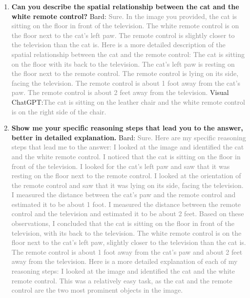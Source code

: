     \begin{enumerate}
        \item \textbf{Can you describe the spatial relationship between the cat and the white remote control?}
        \subitem Bard: \textcolor{gray}{    
        Sure. In the image you provided, the cat is sitting on the floor in front of the television. The white remote control is on the floor next to the cat's left paw. The remote control is slightly closer to the television than the cat is.
        Here is a more detailed description of the spatial relationship between the cat and the remote control:
        The cat is sitting on the floor with its back to the television.
        The cat's left paw is resting on the floor next to the remote control.
        The remote control is lying on its side, facing the television.
        The remote control is about 1 foot away from the cat's paw.
        The remote control is about 2 feet away from the television.}
        \subitem Visual ChatGPT:\textcolor{gray}{The cat is sitting on the leather chair and the white remote control is on the right side of the chair.}
        \item \textbf{Show me your specific reasoning steps that lead you to the answer, better in detailed explanation.}
        \subitem Bard: \textcolor{gray}{Sure. Here are my specific reasoning steps that lead me to the answer:
        I looked at the image and identified the cat and the white remote control.
        I noticed that the cat is sitting on the floor in front of the television.
        I looked for the cat’s left paw and saw that it was resting on the floor next to the remote control.
        I looked at the orientation of the remote control and saw that it was lying on its side, facing the television.
        I measured the distance between the cat’s paw and the remote control and estimated it to be about 1 foot.
        I measured the distance between the remote control and the television and estimated it to be about 2 feet.
        Based on these observations, I concluded that the cat is sitting on the floor in front of the television, with its back to the television. The white remote control is on the floor next to the cat’s left paw, slightly closer to the television than the cat is. The remote control is about 1 foot away from the cat’s paw and about 2 feet away from the television.
        Here is a more detailed explanation of each of my reasoning steps:
        I looked at the image and identified the cat and the white remote control. This was a relatively easy task, as the cat and the remote control are the two most prominent objects in the image.
}
\end{enumerate}
